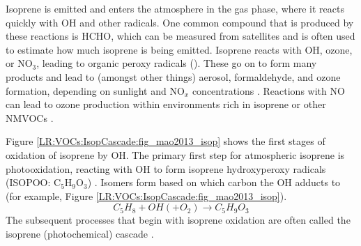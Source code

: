     Isoprene is emitted and enters the atmosphere in the gas phase, where it reacts quickly with OH and other radicals.
    One common compound that is produced by these reactions is HCHO, which can be measured from satellites and is often used to estimate how much isoprene is being emitted.
    Isoprene %
    reacts with OH, ozone, or NO$_3$, leading to organic peroxy radicals (\roo).
    These go on to form many products and lead to (amongst other things) aerosol, formaldehyde, and ozone formation, depending on sunlight and NO$_x$ concentrations \parencite{Atkinson2000}.
    Reactions with NO can lead to ozone production within environments rich in isoprene or other NMVOCs \parencite{Patchen2007,AtkinsonArey2003}.
    
    
    
    Figure \ref{LR:VOCs:IsopCascade:fig_mao2013_isop} shows the first stages of 
    oxidation of isoprene by OH.
    The primary first step for atmospheric isoprene is photooxidation, reacting 
    with OH to form isoprene hydroxyperoxy radicals (ISOPOO: C$_5$H$_9$O$_3$) 
    \parencite{Patchen2007, Wolfe2016, Marvin2017}.
    Isomers form based on which carbon the OH adducts to (for example, Figure 
    \ref{LR:VOCs:IsopCascade:fig_mao2013_isop}).
    \begin{equation} \label{LR:VOCs:IsopCascade:eqn_IsopToIsopoo}
      C_5H_8 + OH (+ O_2) \rightarrow C_5H_9O_3\dot{}
    \end{equation}
    The subsequent processes that begin with isoprene oxidation 
    are often called the isoprene (photochemical) cascade 
    \parencite[e.g.,][]{Crounse2012, Paulot2012, Wolfe2016}.
    
    
    
    
